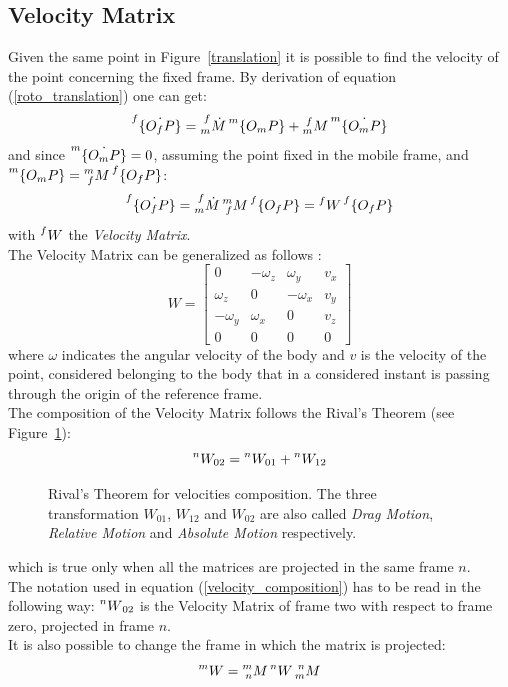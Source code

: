 \documentclass[a4paper,12pt,oneside]{report}
\begin{document}
\subsection{Velocity Matrix}\label{velocity_section}
Given the same point in Figure~\ref{translation} it is possible to find the velocity of the point concerning the fixed frame. By derivation of equation (\ref{roto_translation}) one can get:
\begin{equation}
  \prescript{f}{}{\{\dot{O_fP}\}}=\prescript{f}{m}{\dot{M}}\prescript{m}{}{\{O_mP\}}+\prescript{f}{m}{M}\prescript{m}{}{\{\dot{O_mP}\}}
\end{equation}
and since $\prescript{m}{}{\{\dot{O_mP}\}}=0$, assuming the point fixed in the mobile frame, and $\prescript{m}{}{\{O_mP\}}=\prescript{m}{f}{M}\prescript{f}{}{\{O_fP\}}$:
\begin{equation}
  \prescript{f}{}{\{\dot{O_fP}\}}=\prescript{f}{m}{\dot{M}}\prescript{m}{f}{M}\prescript{f}{}{\{O_fP\}}=\prescript{f}{}{W}\prescript{f}{}{\{O_fP\}}
  \label{velocity_matrix}
\end{equation}
with $\prescript{f}{}{W}$ the \textit{Velocity Matrix}.\\
The Velocity Matrix can be generalized as follows \cite{nine}:
\begin{equation}
  W=\begin{bmatrix}
    0&-\omega_z&\omega_y&v_x\\
    \omega_z&0&-\omega_x&v_y\\
    -\omega_y&\omega_x&0&v_z\\
    0&0&0&0
  \end{bmatrix}
\end{equation}
where $\omega$ indicates the angular velocity of the body and $v$ is the velocity of the point, considered belonging to the body that in a considered instant is passing through the origin of the reference frame.\\
The composition of the Velocity Matrix follows the Rival's Theorem (see Figure~\ref{rival}):
\begin{equation}
  \prescript{n}{}{W_{02}}=\prescript{n}{}{W_{01}}+\prescript{n}{}{W_{12}}
  \label{velocity_composition}
\end{equation}
\begin{figure}[h]
  \centering
  
  \caption{Rival's Theorem for velocities composition. The three transformation $W_{01}$, $W_{12}$ and $W_{02}$ are also called \textit{Drag Motion}, \textit{Relative Motion} and \textit{Absolute Motion} respectively.}
  \label{rival}
\end{figure}
which is true only when all the matrices are projected in the same frame $n$.\\
The notation used in equation (\ref{velocity_composition}) has to be read in the following way: $\prescript{n}{}{W}_{02}$ is the Velocity Matrix of frame two with respect to frame zero, projected in frame $n$.\\
It is also possible to change the frame in which the matrix is projected:
\begin{equation}
  \prescript{m}{}{W}=\prescript{m}{n}{M}\prescript{n}{}{W}\prescript{n}{m}{M}
  \label{change_frame}
\end{equation}
\end{document}
